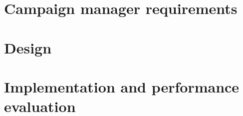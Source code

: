\label{cmanager}

\section{Campaign manager requirements}

\section{Design}

\section{Implementation and performance evaluation}